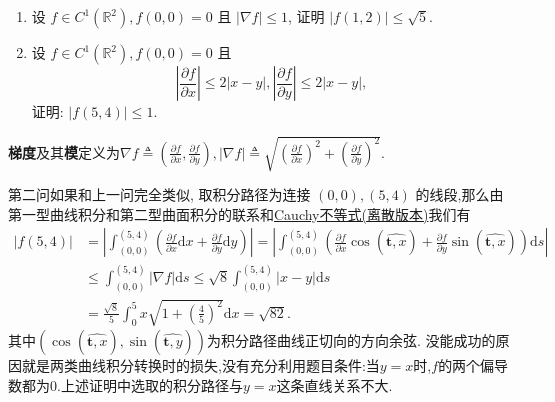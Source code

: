 \documentclass[../../main.tex]{subfiles}%
\begin{document}
\begin{example}
\begin{enumerate}
\item 设 \( f \in C^1(\mathbb{R}^2), f(0,0) = 0 \) 且 \( |\nabla f| \leqslant 1 \), 证明 \( |f(1,2)| \leqslant \sqrt{5} \).

\item 设 \( f \in C^1(\mathbb{R}^2), f(0,0) = 0 \) 且
\[
\left| \frac{\partial f}{\partial x} \right| \leqslant 2|x - y|, \left| \frac{\partial f}{\partial y} \right| \leqslant 2|x - y|,
\]
证明: \( |f(5,4)| \leqslant 1 \).
\end{enumerate}
\end{example}
\begin{remark}
\textbf{梯度}及其\textbf{模}定义为$\nabla f\triangleq \left( \frac{\partial f}{\partial x},\frac{\partial f}{\partial y} \right) ,\left| \nabla f \right|\triangleq \sqrt{\left( \frac{\partial f}{\partial x} \right) ^2+\left( \frac{\partial f}{\partial y} \right) ^2}.$
\end{remark}
\begin{remark}
第二问如果和上一问完全类似, 取积分路径为连接 \( (0,0),(5,4) \) 的线段,那么由第一型曲线积分和第二型曲面积分的联系和\hyperref[theorem:Cauchy不等式(离散版)]{Cauchy不等式(离散版本)}我们有
\[
\begin{aligned}
|f(5,4)|&=\left| \int_{(0,0)}^{(5,4)}{\left( \frac{\partial f}{\partial x}\mathrm{d}x+\frac{\partial f}{\partial y}\mathrm{d}y \right)} \right|=\left| \int_{(0,0)}^{(5,4)}{\left( \frac{\partial f}{\partial x}\cos \left( \widehat{\boldsymbol{t},x} \right) +\frac{\partial f}{\partial y}\sin \left( \widehat{\boldsymbol{t},x} \right) \right) \mathrm{d}s} \right|
\\
&\leqslant \int_{(0,0)}^{(5,4)}{|\nabla f|\mathrm{d}s}\leqslant \sqrt{8}\int_{(0,0)}^{(5,4)}{|x}-y|\mathrm{d}s
\\
&=\frac{\sqrt{8}}{5}\int_0^5{x\sqrt{1+\left( \frac{4}{5} \right) ^2}\mathrm{d}x}=\sqrt{82}.
\end{aligned}
\]
其中$\left( \cos \left( \widehat{\boldsymbol{t},x} \right) ,\sin \left( \widehat{\boldsymbol{t},y} \right) \right) $为积分路径曲线正切向的方向余弦.
没能成功的原因就是两类曲线积分转换时的损失,没有充分利用题目条件:当$y=x$时,$f$的两个偏导数都为0.上述证明中选取的积分路径与$y=x$这条直线关系不大.
\end{remark}
\end{document}
